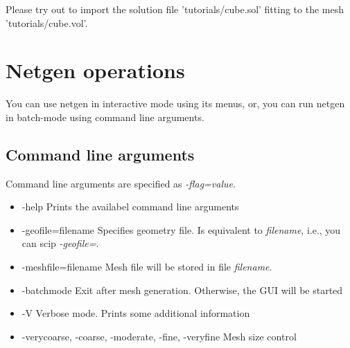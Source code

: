 \documentclass[12pt]{book}
\begin{document}
Please try out to import the solution file 'tutorials/cube.sol' fitting
to the mesh 'tutorials/cube.vol'.


\chapter{Netgen operations}
You can use netgen in interactive mode using its menus, or, you
can run netgen in batch-mode using command line arguments.

\section{Command line arguments}
Command line arguments are specified as {\it -flag=value}.
\begin{itemize}
\item -help \newline
Prints the availabel command line arguments
\item -geofile=filename \newline
Specifies geometry file. Is equivalent to {\it filename}, i.e., you can
scip {\it -geofile=}.
\item -meshfile=filename \newline
Mesh file will be stored in file {\it filename}.
\item -batchmode \newline
Exit after mesh generation. Otherwise, the GUI will be started
\item -V \newline
Verbose mode. Prints some additional information 
\item -verycoarse, -coarse, -moderate, -fine, -veryfine \newline
Mesh size control
\end{itemize}
\end{document}
